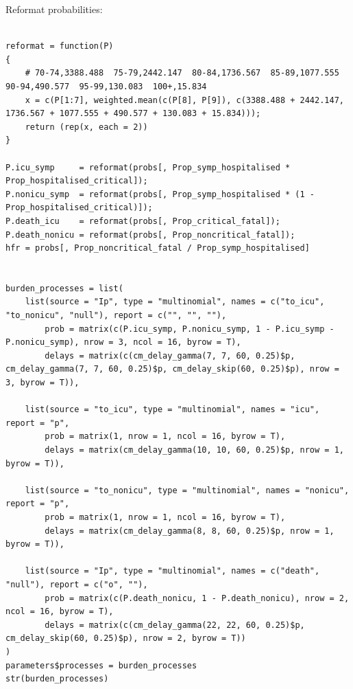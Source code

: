 \documentclass[11pt]{article}
\begin{document}
Reformat probabilities:
\begin{verbatim}

reformat = function(P)
{
    # 70-74,3388.488  75-79,2442.147  80-84,1736.567  85-89,1077.555  90-94,490.577  95-99,130.083  100+,15.834
    x = c(P[1:7], weighted.mean(c(P[8], P[9]), c(3388.488 + 2442.147, 1736.567 + 1077.555 + 490.577 + 130.083 + 15.834)));
    return (rep(x, each = 2))
}

P.icu_symp     = reformat(probs[, Prop_symp_hospitalised * Prop_hospitalised_critical]);
P.nonicu_symp  = reformat(probs[, Prop_symp_hospitalised * (1 - Prop_hospitalised_critical)]);
P.death_icu    = reformat(probs[, Prop_critical_fatal]);
P.death_nonicu = reformat(probs[, Prop_noncritical_fatal]);
hfr = probs[, Prop_noncritical_fatal / Prop_symp_hospitalised]


burden_processes = list(
    list(source = "Ip", type = "multinomial", names = c("to_icu", "to_nonicu", "null"), report = c("", "", ""),
        prob = matrix(c(P.icu_symp, P.nonicu_symp, 1 - P.icu_symp - P.nonicu_symp), nrow = 3, ncol = 16, byrow = T),
        delays = matrix(c(cm_delay_gamma(7, 7, 60, 0.25)$p, cm_delay_gamma(7, 7, 60, 0.25)$p, cm_delay_skip(60, 0.25)$p), nrow = 3, byrow = T)),

    list(source = "to_icu", type = "multinomial", names = "icu", report = "p",
        prob = matrix(1, nrow = 1, ncol = 16, byrow = T),
        delays = matrix(cm_delay_gamma(10, 10, 60, 0.25)$p, nrow = 1, byrow = T)),

    list(source = "to_nonicu", type = "multinomial", names = "nonicu", report = "p",
        prob = matrix(1, nrow = 1, ncol = 16, byrow = T),
        delays = matrix(cm_delay_gamma(8, 8, 60, 0.25)$p, nrow = 1, byrow = T)),

    list(source = "Ip", type = "multinomial", names = c("death", "null"), report = c("o", ""),
        prob = matrix(c(P.death_nonicu, 1 - P.death_nonicu), nrow = 2, ncol = 16, byrow = T),
        delays = matrix(c(cm_delay_gamma(22, 22, 60, 0.25)$p, cm_delay_skip(60, 0.25)$p), nrow = 2, byrow = T))
)
parameters$processes = burden_processes
str(burden_processes)
\end{verbatim}
\end{document}
